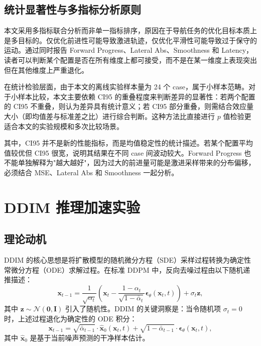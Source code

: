 \subsection{统计显著性与多指标分析原则}

本文采用多指标联合分析而非单一指标排序，原因在于导航任务的优化目标本质上是多目标的。仅优化前进性可能导致激进轨迹，仅优化平滑性可能导致过于保守的运动。通过同时报告 Forward Progress、Lateral Abs、Smoothness 和 Latency，读者可以判断某个配置是否在所有维度上都可接受，而不是在某一维度上表现突出但在其他维度上严重退化。

在统计检验层面，由于本文的离线实验样本量为 24 个 case，属于小样本范畴。对于小样本比较，本文主要依赖 CI95 的重叠程度来判断差异的显著性：若两个配置的 CI95 不重叠，则认为差异具有统计意义；若 CI95 部分重叠，则需结合效应量大小（即均值差与标准差之比）进行综合判断。这种方法比直接进行 $p$ 值检验更适合本文的实验规模和多次比较场景。

其中，CI95 并不是新的性能指标，而是均值稳定性的统计描述。若某个配置平均值较优但 CI95 很宽，说明其结果在不同 case 间波动较大。Forward Progress 也不能单独解释为"越大越好"，因为过大的前进量可能是激进采样带来的分布偏移，必须结合 MSE、Lateral Abs 和 Smoothness 一起分析。

\section{DDIM 推理加速实验}

\subsection{理论动机}

DDIM 的核心思想是将扩散模型的随机微分方程（SDE）采样过程转换为确定性常微分方程（ODE）求解过程\cite{ddim2020}。在标准 DDPM 中，反向去噪过程由以下随机递推描述：
\begin{equation}
\mathbf{x}_{t-1} = \frac{1}{\sqrt{\alpha_t}} \left(\mathbf{x}_t - \frac{1-\alpha_t}{\sqrt{1-\bar{\alpha}_t}} \boldsymbol{\epsilon}_\theta(\mathbf{x}_t, t)\right) + \sigma_t \mathbf{z},
\end{equation}
其中 $\mathbf{z} \sim \mathcal{N}(\mathbf{0}, \mathbf{I})$ 引入了随机性。DDIM 的关键洞察是：当令随机项 $\sigma_t = 0$ 时，上述过程退化为确定性的 ODE 积分：
\begin{equation}
\mathbf{x}_{t-1} = \sqrt{\bar{\alpha}_{t-1}} \cdot \hat{\mathbf{x}}_0(\mathbf{x}_t, t) + \sqrt{1-\bar{\alpha}_{t-1}} \cdot \boldsymbol{\epsilon}_\theta(\mathbf{x}_t, t),
\end{equation}
其中 $\hat{\mathbf{x}}_0$ 是基于当前噪声预测的干净样本估计。

